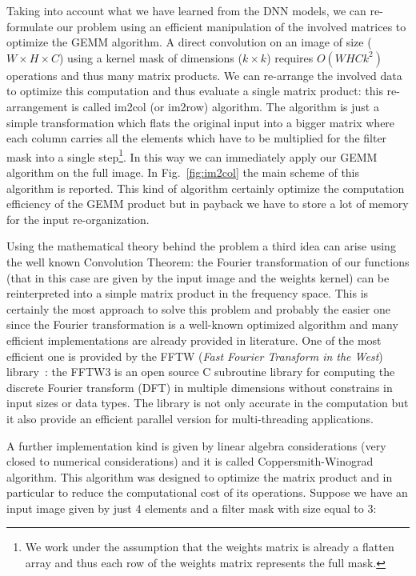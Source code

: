 \documentclass{standalone}
\begin{document}
Taking into account what we have learned from the DNN models, we can re-formulate our problem using an efficient manipulation of the involved matrices to optimize the \textsf{GEMM} algorithm.
A direct convolution on an image of size ($W\times H\times C$) using a kernel mask of dimensions ($k \times k$) requires $O(WHCk^2)$ operations and thus many matrix products.
We can re-arrange the involved data to optimize this computation and thus evaluate a single matrix product: this re-arrangement is called \textsf{im2col} (or \textsf{im2row}) algorithm.
The algorithm is just a simple transformation which flats the original input into a bigger matrix where each column carries all the elements which have to be multiplied for the filter mask into a single step\footnote{
  We work under the assumption that the weights matrix is already a flatten array and thus each row of the weights matrix represents the full mask.
}.
In this way we can immediately apply our \textsf{GEMM} algorithm on the full image.
In Fig.~\ref{fig:im2col} the main scheme of this algorithm is reported.
This kind of algorithm certainly optimize the computation efficiency of the \textsf{GEMM} product but in payback we have to store a lot of memory for the input re-organization.

Using the mathematical theory behind the problem a third idea can arise using the well known Convolution Theorem: the Fourier transformation of our functions (that in this case are given by the input image and the weights kernel) can be reinterpreted into a simple matrix product in the frequency space.
This is certainly the most  approach to solve this problem and probably the easier one since the Fourier transformation is a well-known optimized algorithm and many efficient implementations are already provided in literature.
One of the most efficient one is provided by the \textsf{FFTW} (\emph{Fast Fourier Transform in the West}) library~\cite{FFTW05}: the \textsf{FFTW3} is an open source \textsf{C} subroutine library for computing the discrete Fourier transform (DFT) in multiple dimensions without constrains in input sizes or data types.
The library is not only accurate in the computation but it also provide an efficient parallel version for multi-threading applications.

A further implementation kind is given by linear algebra considerations (very closed to numerical considerations) and it is called \textsf{Coppersmith-Winograd algorithm}.
This algorithm was designed to optimize the matrix product and in particular to reduce the computational cost of its operations.
Suppose we have an input image given by just 4 elements and a filter mask with size equal to 3:
\end{document}

